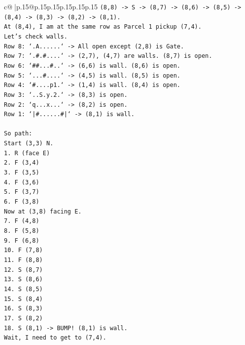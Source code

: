 \documentclass{article}
\begin{document}
{\begin{supertabular}{c@{$\;$}|p{.15\linewidth}@{}p{.15\linewidth}p{.15\linewidth}p{.15\linewidth}p{.15\linewidth}p{.15\linewidth}}
{{{\texttt{(8,8) {-}> S {-}> (8,7) {-}> (8,6) {-}> (8,5) {-}> (8,4) {-}> (8,3) {-}> (8,2) {-}> (8,1).} \\
\texttt{At (8,4), I am at the same row as Parcel 1 pickup (7,4).} \\
\texttt{Let's check walls.} \\
\texttt{Row 8: `.A......` {-}> All open except (2,8) is Gate.} \\
\texttt{Row 7: `.\#.\#....` {-}> (2,7), (4,7) are walls. (8,7) is open.} \\
\texttt{Row 6: `\#\#...\#..` {-}> (6,6) is wall. (8,6) is open.} \\
\texttt{Row 5: `...\#....` {-}> (4,5) is wall. (8,5) is open.} \\
\texttt{Row 4: `\#....p1.` {-}> (1,4) is wall. (8,4) is open.} \\
\texttt{Row 3: `..S.y.2.` {-}> (8,3) is open.} \\
\texttt{Row 2: `q...x...` {-}> (8,2) is open.} \\
\texttt{Row 1: `|\#......\#|` {-}> (8,1) is wall.} \\
\\ 
\texttt{So path:} \\
\texttt{Start (3,3) N.} \\
\texttt{1. R (face E)} \\
\texttt{2. F (3,4)} \\
\texttt{3. F (3,5)} \\
\texttt{4. F (3,6)} \\
\texttt{5. F (3,7)} \\
\texttt{6. F (3,8)} \\
\texttt{Now at (3,8) facing E.} \\
\texttt{7. F (4,8)} \\
\texttt{8. F (5,8)} \\
\texttt{9. F (6,8)} \\
\texttt{10. F (7,8)} \\
\texttt{11. F (8,8)} \\
\texttt{12. S (8,7)} \\
\texttt{13. S (8,6)} \\
\texttt{14. S (8,5)} \\
\texttt{15. S (8,4)} \\
\texttt{16. S (8,3)} \\
\texttt{17. S (8,2)} \\
\texttt{18. S (8,1) {-}> BUMP! (8,1) is wall.} \\
\texttt{Wait, I need to get to (7,4).} \\
}}}
\end{supertabular}}
\end{document}

